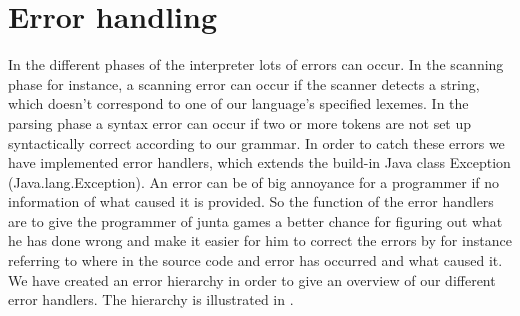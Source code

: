 \section{Error handling}
\label{sec:errorhandling}

In the different phases of the interpreter lots of errors can occur. In the scanning phase for instance,
a scanning error can occur if the scanner detects a string, which doesn't correspond to one of our language's specified lexemes. In the parsing phase a syntax error can occur if two or more tokens are not set up syntactically correct according to our grammar. In order to catch these errors we have implemented error handlers, which extends the build-in Java class Exception (Java.lang.Exception). An error can be of big annoyance for a programmer if no information of what caused it is provided. So the function of the error handlers are to give the programmer of junta games a better chance for figuring out what he has done wrong and make it easier for him to correct the errors by for instance referring to where in the source code and error has occurred and what caused it. We have created an error hierarchy in order to give an overview of our different error handlers. The hierarchy is illustrated in . 


\begin{figure}[ht]
	\begin{center}
	\end{center}
	\label{ast:errorhierarchy}
\end{figure}

